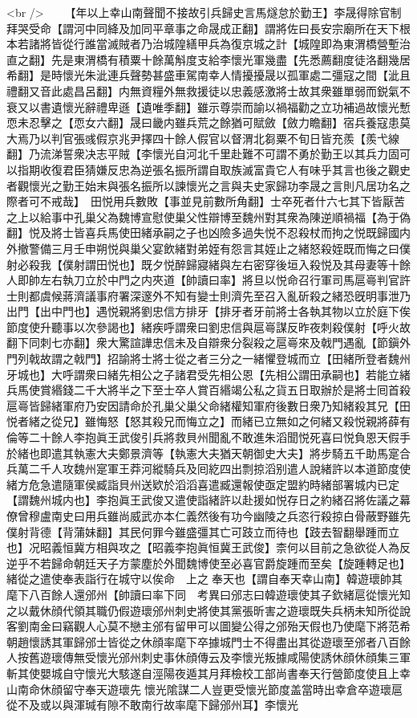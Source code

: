 <br />
　　【年以上幸山南聲聞不接故引兵歸史言馬燧怠於勤王】李晟得除官制拜哭受命【謂河中同絳及加同平章事之命晟成正翻】謂將佐曰長安宗廟所在天下根本若諸將皆從行誰當滅賊者乃治城隍繕甲兵為復京城之計【城隍即為東渭橋營塹治直之翻】先是東渭橋有積粟十餘萬斛度支給李懷光軍幾盡【先悉薦翻度徒洛翻幾居希翻】是時懷光朱泚連兵聲勢甚盛車駕南幸人情擾擾晟以孤軍處二彊寇之間【泚且禮翻又音此處昌呂翻】内無資糧外無救援徒以忠義感激將士故其衆雖單弱而鋭氣不衰又以書遺懷光辭禮卑遜【遺唯季翻】雖示尊崇而諭以禍福勸之立功補過故懷光慙恧未忍擊之【恧女六翻】晟曰畿内雖兵荒之餘猶可賦斂【斂力瞻翻】宿兵養寇患莫大焉乃以判官張彧假京兆尹擇四十餘人假官以督渭北芻粟不旬日皆充羨【羨弋線翻】乃流涕誓衆决志平賊【李懷光自河北千里赴難不可謂不勇於勤王以其兵力固可以指期收復君臣猜嫌反忠為逆張名振所謂自取族滅富貴它人有味乎其言也後之觀史者觀懷光之勤王始末與張名振所以諫懷光之言與夫史家歸功李晟之言則凡居功名之際者可不戒哉】　田悦用兵數敗【事並見前數所角翻】士卒死者什六七其下皆厭苦之上以給事中孔巢父為魏博宣慰使巢父性辯博至魏州對其衆為陳逆順禍福【為于偽翻】悦及將士皆喜兵馬使田緒承嗣之子也凶險多過失悦不忍殺杖而拘之悦既歸國内外撤警備三月壬申朔悦與巢父宴飲緒對弟姪有怨言其姪止之緒怒殺姪既而悔之曰僕射必殺我【僕射謂田悦也】既夕悦醉歸寢緒與左右密穿後垣入殺悦及其母妻等十餘人即帥左右執刀立於中門之内夾道【帥讀曰率】將旦以悦命召行軍司馬扈㠋判官許士則都虞候蔣濟議事府署深邃外不知有變士則濟先至召入亂斫殺之緒恐旣明事泄乃出門【出中門也】遇悦親將劉忠信方排牙【排牙者牙前將士各執其物以立於庭下俟節度使升聽事以次參謁也】緒疾呼謂衆曰劉忠信與扈㠋謀反昨夜刺殺僕射【呼火故翻下同刺七亦翻】衆大驚諠譁忠信未及自辯衆分裂殺之扈㠋來及戟門遇亂【節鎭外門列戟故謂之戟門】招諭將士將士從之者三分之一緒懼登城而立【田緒所登者魏州牙城也】大呼謂衆曰緒先相公之子諸君受先相公恩【先相公謂田承嗣也】若能立緒兵馬使賞緡錢二千大將半之下至士卒人賞百緡竭公私之貨五日取辦於是將士囘首殺扈㠋皆歸緒軍府乃安因請命於孔巢父巢父命緒權知軍府後數日衆乃知緒殺其兄【田悦者緒之從兄】雖悔怒【怒其殺兄而悔立之】而緒已立無如之何緒又殺悦親將薛有倫等二十餘人李抱眞王武俊引兵將救貝州聞亂不敢進朱滔聞悦死喜曰悦負恩天假手於緒也即遣其執憲大夫鄭景濟等【執憲大夫猶天朝御史大夫】將步騎五千助馬寔合兵萬二千人攻魏州寔軍王莽河縱騎兵及囘紇四出剽掠滔别遣人說緒許以本道節度使緒方危急遣隨軍侯臧詣貝州送欵於滔滔喜遣臧還報使亟定盟約時緒部署城内已定【謂魏州城内也】李抱眞王武俊又遣使詣緒許以赴援如悦存日之約緒召將佐議之幕僚曾穆盧南史曰用兵雖尚威武亦本仁義然後有功今幽陵之兵恣行殺掠白骨蔽野雖先僕射背德【背蒲妹翻】其民何罪今雖盛彊其亡可跂立而待也【跂去智翻舉踵而立也】况昭義恒冀方相與攻之【昭義李抱眞恒冀王武俊】柰何以目前之急欲從人為反逆乎不若歸命朝廷天子方蒙塵於外聞魏博使至必喜官爵旋踵而至矣【旋踵轉足也】緒從之遣使奉表詣行在城守以俟命　上之奉天也【謂自奉天幸山南】韓遊瓌帥其麾下八百餘人還邠州【帥讀曰率下同　考異曰邠志曰韓遊瓌使其子欽緒扈從懷光知之以戴休顔代領其職仍假遊瓌邠州刺史將使其黨張昕害之遊瓌既失兵柄未知所從說客劉南金曰竊觀人心莫不戀主邠有留甲可以圖變公得之邠殆天假也乃使麾下將范希朝趙懷誘其軍歸邠士皆從之休顔率麾下卒據城門士不得盡出其從遊瓌至邠者八百餘人按舊遊瓌傳無受懷光邠州刺史事休顔傳云及李懷光叛據咸陽使誘休顔休顔集三軍斬其使嬰城自守懷光大駭遂自涇陽夜遁其月拜檢校工部尚書奉天行營節度使且上幸山南命休顔留守奉天遊瓌先懷光隂謀二人豈更受懷光節度盖當時出幸倉卒遊瓌扈從不及或以與渾瑊有隙不敢南行故率麾下歸邠州耳】李懷光